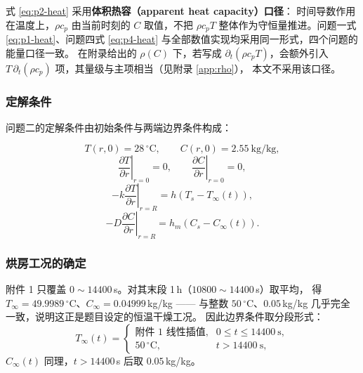 \documentclass[12pt,a4paper,fontset=none]{ctexart}
\begin{document}
式 \eqref{eq:p2-heat} 采用\textbf{体积热容（apparent heat capacity）口径}：
时间导数作用在温度上，$\rho c_p$ 由当前时刻的 $C$ 取值，不把
$\rho c_p T$ 整体作为守恒量推进。问题一式 \eqref{eq:p1-heat}、问题四式
\eqref{eq:p4-heat} 与全部数值实现均采用同一形式，四个问题的能量口径一致。
在附录给出的 $\rho(C)$ 下，若写成 $\partial_t(\rho c_pT)$，会额外引入
$T\,\partial_t(\rho c_p)$ 项，其量级与主项相当（见附录 \ref{app:rho}），
本文不采用该口径。

\subsubsection{定解条件}

问题二的定解条件由初始条件与两端边界条件构成：

\begin{equation}
  T(r,0)=28\,^\circ\mathrm{C},\qquad C(r,0)=2.55\ \mathrm{kg/kg},
  \label{eq:p2-ic}
\end{equation}
\begin{equation}
  \left.\frac{\partial T}{\partial r}\right|_{r=0}=0,\qquad
  \left.\frac{\partial C}{\partial r}\right|_{r=0}=0,
  \label{eq:p2-center}
\end{equation}
\begin{equation}
  -k\left.\frac{\partial T}{\partial r}\right|_{r=R}
  =h\left(T_s-T_\infty(t)\right),
  \label{eq:p2-bcT}
\end{equation}
\begin{equation}
  -D\left.\frac{\partial C}{\partial r}\right|_{r=R}
  =h_m\left(C_s-C_\infty(t)\right).
  \label{eq:p2-bcC}
\end{equation}

\subsubsection{烘房工况的确定}
\label{sec:bc}

附件 1 只覆盖 $0\sim14400$\,s。对其末段 1\,h（$10800\sim14400$\,s）取平均，
得 $T_\infty=49.9989\,^\circ$C、$C_\infty=0.04999$\,kg/kg —— 与整数
$50\,^\circ$C、$0.05$\,kg/kg 几乎完全一致，说明这正是题目设定的恒温干燥工况。
因此边界条件取分段形式：
\begin{equation}
  T_\infty(t)=
  \begin{cases}
    \text{附件 1 线性插值}, & 0\le t\le 14400\ \mathrm{s},\\[2pt]
    50\,^\circ\mathrm{C}, & t>14400\ \mathrm{s},
  \end{cases}
  \label{eq:p2-Tinf}
\end{equation}
$C_\infty(t)$ 同理，$t>14400$\,s 后取 $0.05$\,kg/kg。
\end{document}
